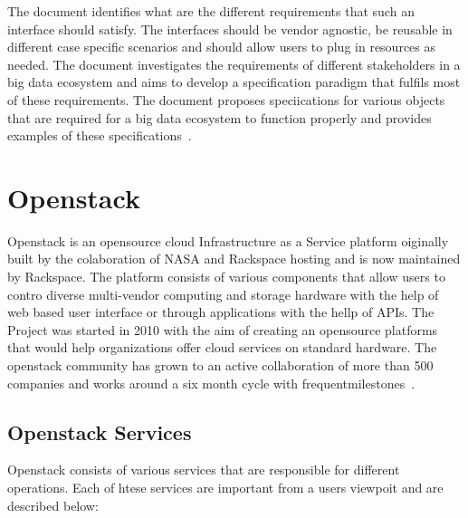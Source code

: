 The document identifies what are the different requirements that such
an interface should satisfy. The interfaces should be vendor agnostic,
be reusable in different case specific scenarios and should allow
users to plug in resources as needed. The document investigates the
requirements of different stakeholders in a big data ecosystem and
aims to develop a specification paradigm that fulfils most of these
requirements. The document proposes speciications for various objects
that are required for a big data ecosystem to function properly and
provides examples of these specifications~\cite{hid-sp18-503-BDRA}.

\section{Openstack}

Openstack is an opensource cloud Infrastructure as a Service platform
oiginally built by the colaboration of NASA and Rackspace hosting and
is now maintained by Rackspace. The platform consists of various
components that allow users to contro diverse multi-vendor computing
and storage hardware with the help of web based user interface or
through applications with the hellp of APIs.  The Project was started
in 2010 with the aim of creating an opensource platforms that would
help organizations offer cloud services on standard hardware. The
openstack community has grown to an active collaboration of more than
500 companies and works around a six month cycle with
frequentmilestones~\cite{hid-sp18-503-openstack-wiki}.

\subsection{Openstack Services}
Openstack consists of various services that are responsible for
different operations. Each of htese services are important from a
users viewpoit and are described below:

